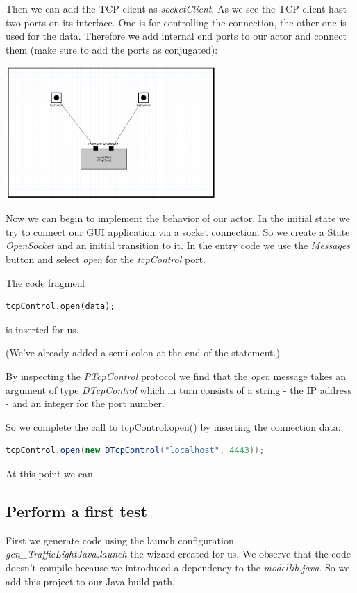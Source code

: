 Then we can add the TCP client as \textit{socketClient}.
As we see the TCP client hast two ports on its interface. One is for controlling the connection, the other one
is used for the data. Therefore we add internal end ports to our actor and connect them
(make sure to add the ports as conjugated):

\includegraphics[width=0.6\textwidth]{images/018-socketSvc.png}

Now we can begin to implement the behavior of our actor.
In the initial state we try to connect our GUI application via a socket connection.
So we create a State \textit{OpenSocket} and an initial transition to it.
In the entry code we use the \textit{Messages} button and select \textit{open} for the \textit{tcpControl} port.

The code fragment
\begin{lstlisting}[language=ROOM]
tcpControl.open(data);
\end{lstlisting}
is inserted for us.

(We've already added a semi colon at the end of the statement.)

By inspecting the \textit{PTcpControl} protocol we find that the \textit{open} message takes an argument
of type \textit{DTcpControl} which in turn consists of a string - the IP address - and an integer for the
port number.

So we complete the call to tcpControl.open() by inserting the connection data:
\begin{lstlisting}[language=Java]
tcpControl.open(new DTcpControl("localhost", 4443));
\end{lstlisting}

At this point we can

\subsection{Perform a first test}

First we generate code using the launch configuration \textit{gen\_TrafficLightJava.launch} the wizard created for us.
We observe that the code doesn't compile because we introduced a dependency to the \textit{modellib.java}.
So we add this project to our Java build path.

